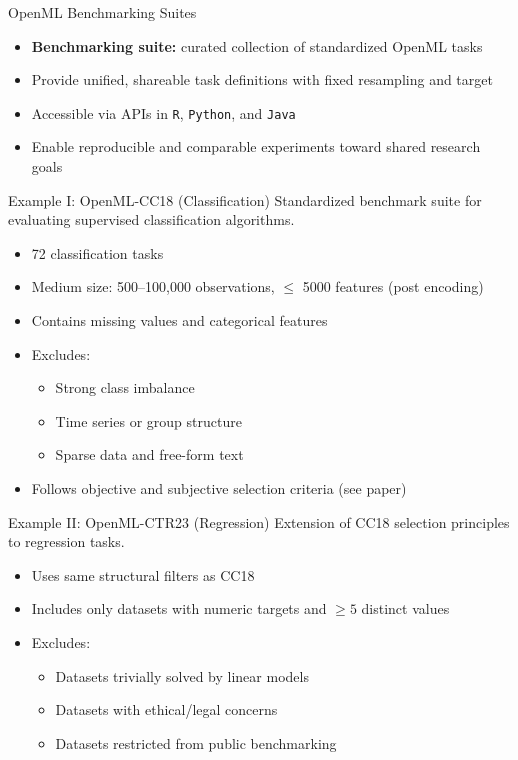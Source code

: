 \documentclass[11pt,compress,t,notes=noshow, xcolor=table]{beamer}
\begin{document}
\begin{vbframe}{OpenML Benchmarking Suites}
\vfill
\begin{itemize}
    \item \textbf{Benchmarking suite:} curated collection of standardized OpenML tasks
    \item Provide unified, shareable task definitions with fixed resampling and target
    \item Accessible via APIs in \texttt{R}, \texttt{Python}, and \texttt{Java}
    \item Enable reproducible and comparable experiments toward shared research goals
\end{itemize}
\vfill
\end{vbframe}

\begin{vbframe}{Example I: OpenML-CC18 (Classification) }
\vfill
Standardized benchmark suite for evaluating supervised classification algorithms.
\vspace{0.5em}
\begin{itemize}
    \item 72 classification tasks
    \item Medium size: 500–100,000 observations, $\leq$ 5000 features (post encoding)
    \item Contains missing values and categorical features
    \item Excludes:
    \begin{itemize}
        \item Strong class imbalance
        \item Time series or group structure
        \item Sparse data and free-form text
    \end{itemize}
    \item Follows objective and subjective selection criteria (see paper)
\end{itemize}
\vfill
\end{vbframe}

\begin{vbframe}{Example II: OpenML-CTR23 (Regression) }
\vfill
Extension of CC18 selection principles to regression tasks.
\vspace{0.5em}
\begin{itemize}
    \item Uses same structural filters as CC18
    \item Includes only datasets with numeric targets and $\geq 5$ distinct values
    \item Excludes:
    \begin{itemize}
        \item Datasets trivially solved by linear models
        \item Datasets with ethical/legal concerns
        \item Datasets restricted from public benchmarking
    \end{itemize}
\end{itemize}
\vfill
\end{vbframe}
\end{document}

